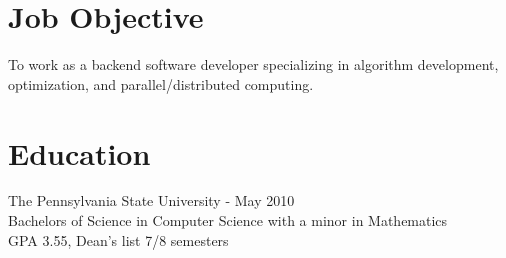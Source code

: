 \documentclass{res}
\begin{document}
 


\vspace{-24pt}
\address{bennet.huber@gmail.com\\(215) 490-4297}
\address{739 S 20th St, Suite 2\\Philadelphia, PA 19146}

\begin{resume}

\section{Job Objective}
    To work as a backend software developer specializing in algorithm development, optimization,
    and parallel/distributed computing.
 
\section{Education}
    The Pennsylvania State University - May 2010\\
    Bachelors of Science in Computer Science with a minor in Mathematics\\
    GPA 3.55, Dean's list 7/8 semesters
 

\end{resume}
\end{document}
